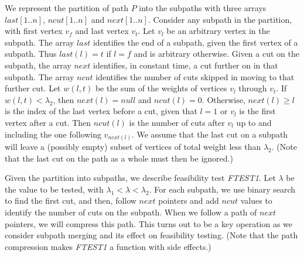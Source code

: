 We represent the partition of path $P$ into the subpaths with 
three arrays $last[1..n]$, $ncut[1..n]$ and $next[1..n]$. 
Consider any subpath in the partition,
with first vertex $v_f$ and last vertex $v_t$.
Let $v_l$ be an arbitrary vertex in the subpath.
The array $last$ identifies the end of a subpath,
given the first vertex of a subpath.
Thus $last(l)=t$ if $l=f$ and is arbitrary otherwise.
Given a cut on the subpath,
the array $next$ identifies,
in constant time, a cut further on in that subpath.
The array $ncut$ identifies the number of cuts skipped
in moving to that further cut.
Let $w(l,t)$ be the sum of the weights of vertices $v_l$ through $v_t$.
If $w(l,t) < \lambda_2$,
then $next(l)=null$ and $ncut(l)=0$.
Otherwise, $next(l) \geq l$ is the index of the last vertex before a cut,
given that $l=1$ or $v_l$ is the first vertex after a cut.
Then $ncut(l)$ is the number of cuts after $v_l$ up to and including the one
following $v_{next(l)}$.
We assume that the last cut on a subpath will leave
a (possibly empty) subset of vertices of total weight less than $\lambda_2$.
(Note that the last cut on the path as a whole must then be ignored.)

Given the partition into subpaths, we describe feasibility test {\it FTEST1}.
Let $\lambda$ be the value to be tested,
with $\lambda_1 < \lambda < \lambda_2$.
For each subpath, we use binary search to find the first cut,
and then, follow $next$ pointers and add $ncut$ values to
identify the number of cuts on the subpath.
When we follow a path of $next$ pointers,
we will compress this path.
This turns out to be a key operation as we consider
subpath merging and its effect on feasibility testing.
(Note that the path compression makes
{\it FTEST1} a function with side effects.)\\

